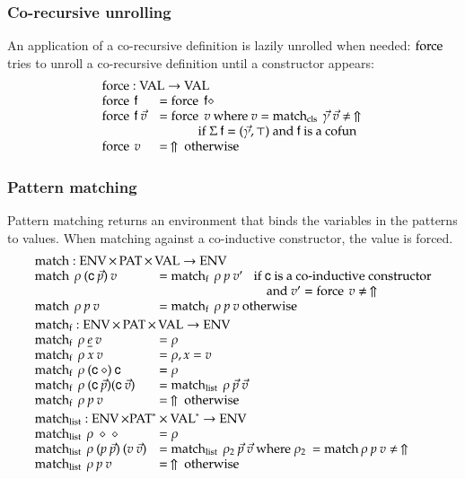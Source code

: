 \subsubsection{Co-recursive unrolling}
An application of a co-recursive definition is lazily unrolled when needed: 
$\operatorname{force}$ tries to unroll a co-recursive definition until a constructor appears:
\[
\begin{array}{ll}
\multicolumn{2}{l}{\forc : \Val \ra \Val }\\
\forc \: \ff & = \forc \; \ff \diamond \\
\forc \: \ff \: \vec{v} & = \forc \; v \mbox{ where } v = \matchcls \: \vec{\gamma} \: \vec{v} \neq \stuck \:\\
& \spcx \mbox{ if } \Sig \: \ff = (\vec{\gamma},\top) \mbox { and } \ff \mbox { is a } \cofun\\ 
\forc \: v & = \stuck \mbox{ otherwise}
\end{array}
\]


\subsubsection{Pattern matching}
Pattern matching returns an environment that binds the variables in the patterns to values.
When matching against a co-inductive constructor, the value is forced.
\[
\begin{array}{ll}
\multicolumn{2}{l}{\match : \Env \times \Pat \times \Val \ra \Env}\\
\match \: \rho \: (\cc \: \vec{p}) \: v & = \matchf \: \rho \: p \: v' \spc \mbox{if  } \cc  \mbox{ is a co-inductive constructor}\\
& \spcx \spcx \spcx \mbox{and } v' = \forc \: v \neq \stuck \\
\match \: \rho \: p \: v & = \matchf \: \rho \: p \: v \mbox{ otherwise}
\vs\\
\multicolumn{2}{l}{\matchf : \Env \times \Pat \times \Val \ra \Env}\\
\matchf \: \rho \: \inacc{e} \: v & = \rho \\
\matchf \: \rho \: x \: v & = \ins{\rho}{x}{v} \\
\matchf \: \rho \: (\cc \: \diamond) \: \cc & = \rho \\
\matchf \: \rho \: (\cc \: \vec{p}) (\cc \: \vec{v}) & = \matchList \: \rho \: \vec{p} \: \vec{v} \\
\matchf \: \rho \: p \: v & = \stuck \mbox{ otherwise}
\vs\\
\multicolumn{2}{l}{\matchList : \Env \times \ves{\Pat} \times \ves{\Val} \ra \Env }\\
\matchList \: \rho \: \diamond \: \diamond & = \rho \\
\matchList \: \rho \: (p \: \vec{p}) \: (v \: \vec{v}) & = \matchList \: \rho_2 \: \vec{p} \: \vec{v} \mbox{ where } \rho_2 \: = \match \rho \: p \: v \neq \stuck \\
\matchList \: \rho \: p \: v & = \stuck \mbox { otherwise } \\
\end{array}
\]


